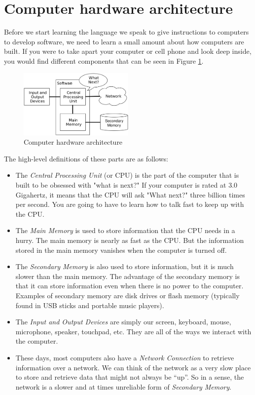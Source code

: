\hypertarget{arquitectura-hardware-de-los-ordenadores}{%
\section{Computer hardware architecture}\label{arquitectura-hardware-de-los-ordenadores}}

 

Before we start learning the language we speak to give instructions to computers to develop software, we need to learn a small amount about how computers are built. If you were to take apart your computer or cell phone and look deep inside, you would find different components that can be seen in Figure \ref{fig:arch}.

\begin{figure}
    \centering
    \includegraphics[width=0.5\textwidth]{images/comp-hw-arch.jpg}
    \caption{Computer hardware architecture}
    \label{fig:arch}
\end{figure}


The high-level definitions of these parts are as follows:

\begin{itemize}[nosep]
\item
  The \emph{Central Processing Unit} (or CPU) is the part of the computer that is built to be obsessed with "what is next?" If your computer is rated at 3.0 Gigahertz, it means that the CPU will ask "What next?" three billion times per second. You are going to have to learn how to talk fast to keep up with the CPU.
\item
  The \emph{Main Memory} is used to store information that the CPU needs in a hurry. The main memory is nearly as fast as the CPU. But the information stored in the main memory vanishes when the computer is turned off.
\item
  The \emph{Secondary Memory} is also used to store information, but it is much slower than the main memory. The advantage of the secondary memory is that it can store information even when there is no power to the computer. Examples of secondary memory are disk drives or flash memory (typically found in USB sticks and portable music players).
\item
  The \emph{Input and Output Devices} are simply our screen, keyboard, mouse, microphone, speaker, touchpad, etc. They are all of the ways we interact with the computer.
\item
  These days, most computers also have a \emph{Network Connection} to retrieve information over a network. We can think of the network as a very slow place to store and retrieve data that might not always be ``up''. So in a sense, the network is a slower and at times unreliable form of \emph{Secondary Memory}.
\end{itemize}

